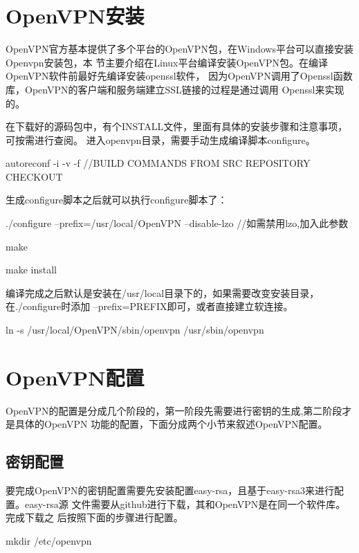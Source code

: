 \documentclass[a4paper,12pt]{report}
\begin{document}
\begin{spacing}{1.5}
\section{OpenVPN安装}
OpenVPN官方基本提供了多个平台的OpenVPN包，在Windows平台可以直接安装Openvpn安装包，本
节主要介绍在Linux平台编译安装OpenVPN包。在编译OpenVPN软件前最好先编译安装openssl软件，
因为OpenVPN调用了Openssl函数库，OpenVPN的客户端和服务端建立SSL链接的过程是通过调用
Openssl来实现的。

在下载好的源码包中，有个INSTALL文件，里面有具体的安装步骤和注意事项，可按需进行查阅。
进入openvpn目录，需要手动生成编译脚本configure。

\begin{tcolorbox}[notitle,boxrule=0pt,colback=gray!20,colframe=gray!20]
autoreconf -i -v -f 
{\color{red} 
//BUILD COMMANDS FROM SRC REPOSITORY CHECKOUT
}
\end{tcolorbox}

生成configure脚本之后就可以执行configure脚本了：
\begin{tcolorbox}[notitle,boxrule=0pt,colback=gray!20,colframe=gray!20]
./configure --prefix=/usr/local/OpenVPN --disable-lzo  
{\color{red} 
//如需禁用lzo,加入此参数
}

make

make install
\end{tcolorbox}
编译完成之后默认是安装在/usr/local目录下的，如果需要改变安装目录，在./configure时添加
--prefix=PREFIX即可，或者直接建立软连接。
\begin{tcolorbox}[notitle,boxrule=0pt,colback=gray!20,colframe=gray!20]
ln -s /usr/local/OpenVPN/sbin/openvpn /usr/sbin/openvpn
\end{tcolorbox}

\section{OpenVPN配置}
OpenVPN的配置是分成几个阶段的，第一阶段先需要进行密钥的生成,第二阶段才是具体的OpenVPN
功能的配置，下面分成两个小节来叙述OpenVPN配置。

\subsection{密钥配置}
要完成OpenVPN的密钥配置需要先安装配置easy-rsa，且基于easy-rsa3来进行配置。easy-rsa源
文件需要从github进行下载\cite{easy-rsa.web}，其和OpenVPN是在同一个软件库。完成下载之
后按照下面的步骤进行配置。
\begin{tcolorbox}[notitle,boxrule=0pt,colback=gray!20,colframe=gray!20]
mkdir /etc/openvpn


\end{tcolorbox}
\end{spacing}
\end{document}
